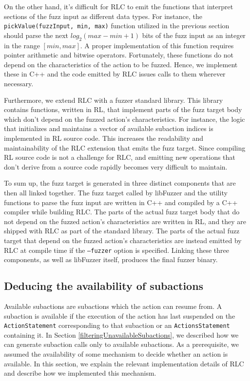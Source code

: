 On the other hand, it's difficult for RLC to emit the functions that interpret sections of the fuzz input as different data types.
For instance, the \texttt{pickValue(fuzzInput, min, max)} function utilized in the previous section should parse the next $log_2(max - min + 1)$ bits of 
    the fuzz input as an integer in the range $[min, max]$.
A proper implementation of this function requires pointer arithmetic and bitwise operators.
Fortunately, these functions do not depend on the characteristics of the action to be fuzzed.
Hence, we implement these in C++ and the code emitted by RLC issues calls to them wherever necessary.

Furthermore, we extend RLC with a fuzzer standard library.
This library contains functions, written in RL, that implement parts of the fuzz target body which don't depend on the fuzzed action's characteristics.
For instance, the logic that initializes and maintains a vector of available subaction indices is implemented in RL source code.
This increases the readability and maintainability of the RLC extension that emits the fuzz target.
Since compiling RL source code is not a challenge for RLC, and emitting new operations that don't derive from a source code rapidly becomes very difficult to maintain.

To sum up, the fuzz target is generated in three distinct components that are then all linked together.
The fuzz target called by libFuzzer and the utility functions to parse the fuzz input are written in C++ and compiled by a C++ compiler while building RLC.
The parts of the actual fuzz target body that do not depend on the fuzzed action's characteristics are written in RL, and they are shipped with RLC as part of the standard library.
The parts of the actual fuzz target that depend on the fuzzed action's characteristics are instead emitted by RLC at compile time if the \texttt{--fuzzer} option is specified.
Linking these three components, as well as libFuzzer itself, produces the final fuzzer binary.

\subsection{Deducing the availability of subactions}\label{decidingAvailability}
Available subactions are subactions which the action can resume from. A subaction is available if the execution of the action has last suspended on the \texttt{ActionStatement} corresponding to that subaction or an \texttt{ActionsStatement} containing it.
In Section \ref{filteringUnavailableSubactions}, we described how we can generate subaction calls only to available subactions.
As a prerequisite, we assumed the availability of some mechanism to decide whether an action is available.
In this section, we explain the relevant implementation details of RLC and describe how we implemented this mechanism.


